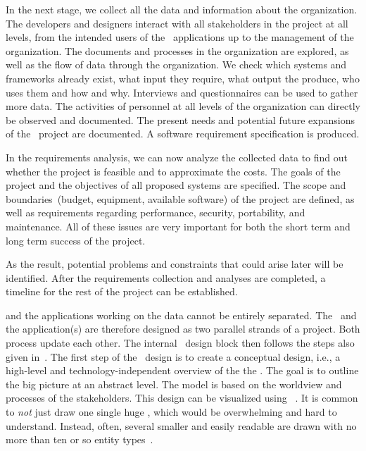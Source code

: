 In the next stage, we collect all the data and information about the organization.
The developers and designers interact with all stakeholders in the project at all levels, from the intended users of the \db\ applications up to the management of the organization.
The documents and processes in the organization are explored, as well as the flow of data through the organization.
We check which systems and frameworks already exist, what input they require, what output the produce, who uses them and how and why.
Interviews and questionnaires can be used to gather more data.
The activities of personnel at all levels of the organization can directly be observed and documented.
The present needs and potential future expansions of the \db\ project are documented.
A software requirement specification is produced.

In the requirements analysis, we can now analyze the collected data to find out whether the project is feasible and to approximate the costs.
The goals of the project and the objectives of all proposed systems are specified.
The scope and boundaries~(budget, equipment, available software) of the project are defined, as well as requirements regarding performance, security, portability, and maintenance.
All of these issues are very important for both the short term and long term success of the project.

As the result, potential problems and constraints that could arise later will be identified.
After the requirements collection and analyses are completed, a timeline for the rest of the project can be established.

 and the applications working on the data cannot be entirely separated.
The \db\ and the application(s) are therefore designed as two parallel strands of a project.
Both process update each other.
The internal \db\ design block then follows the steps also given in~\cite{EN2015FODS}.
The first step of the \db\ design is to create a conceptual design, i.e., a high-level and technology-independent overview of the the \db.
The goal is to outline the big picture at an abstract level.
The model is based on the worldview and processes of the stakeholders.
This design can be visualized using ~\cite{WF1995DHQDM,B1990CMERMO}.
It is common to \emph{not} just draw one single huge , which would be overwhelming and hard to understand.
Instead, often, several smaller and easily readable  are drawn with no more than ten or so entity types~\cite{WF1995DHQDM}.

